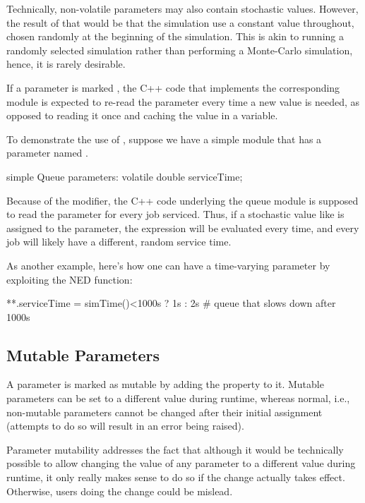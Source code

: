 \begin{note}
  Technically, non-volatile parameters may also contain stochastic values.
  However, the result of that would be that the simulation use a constant value
  throughout, chosen randomly at the beginning of the simulation. This is akin
  to running a randomly selected simulation rather than performing a Monte-Carlo
  simulation, hence, it is rarely desirable.
\end{note}

If a parameter is marked , the C++ code that implements the
corresponding module is expected to re-read the parameter every time a new value
is needed, as opposed to reading it once and caching the value in a variable.

To demonstrate the use of , suppose we have a 
simple module that has a  parameter named
.

\begin{ned}
simple Queue
{
    parameters:
        volatile double serviceTime;
}
\end{ned}

Because of the  modifier, the C++ code underlying the queue
module is supposed to read the  parameter for every job
serviced. Thus, if a stochastic value like  is assigned
to the parameter, the expression will be evaluated every time, and every job
will likely have a different, random service time.

As another example, here's how one can have a time-varying parameter by
exploiting the  NED function:

\begin{inifile}
**.serviceTime = simTime()<1000s ? 1s : 2s  # queue that slows down after 1000s
\end{inifile}


\subsection{Mutable Parameters}
\label{sec:ned-lang:mutable}

A parameter is marked as mutable by adding the  property to it.
Mutable parameters can be set to a different value during runtime, whereas
normal, i.e., non-mutable parameters cannot be changed after their initial
assignment (attempts to do so will result in an error being raised).

Parameter mutability addresses the fact that although it would be technically
possible to allow changing the value of any parameter to a different value
during runtime, it only really makes sense to do so if the change actually takes
effect. Otherwise, users doing the change could be mislead.

